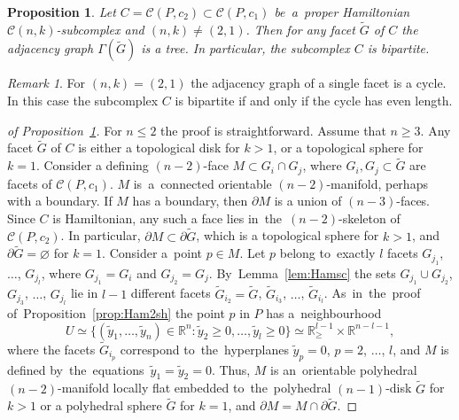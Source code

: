 \documentclass[12pt]{amsart}
\newtheorem{proposition}[formula]{Proposition}
\theoremstyle{definition}
\theoremstyle{remark}
\newtheorem{remark}[formula]{Remark}
\begin{document}
\begin{proposition}\label{prop:cnkbh}
Let $C=\mathcal{C}(P,c_2)\subset \mathcal{C}(P,c_1)$ be~a~proper Hamiltonian \linebreak $\mathcal{C}(n,k)$-subcomplex
and $(n,k)\ne (2,1)$. 
Then for any facet $\widetilde{G}$ of $C$ the adjacency graph $\Gamma(\widetilde{G})$ is a tree. In particular, the subcomplex $C$ is bipartite.
\end{proposition}
\begin{remark} For $(n,k)=(2,1)$ the adjacency graph of a single facet is a cycle. 
In this case the subcomplex $C$ is bipartite if and only if the cycle has even length.
\end{remark}
\begin{proof}[of Proposition~\ref{prop:cnkbh}]
For $n\leqslant 2$ the proof is straightforward. Assume that $n\geqslant 3$.
Any facet $\widetilde{G}$ of $C$ is either a topological disk for $k>1$, or a topological sphere for $k=1$. 
Consider a defining $(n-2)$-face $M\subset G_i\cap G_j$,
where $G_i,G_j\subset \widetilde{G}$ are facets of $\mathcal{C}(P,c_1)$. $M$ is~a~connected orientable $(n-2)$-manifold,
perhaps with a boundary. If $M$ has a boundary, then $\partial M$ is a union of $(n-3)$-faces. 
Since $C$ is Hamiltonian, any such a face lies in~the~$(n-2)$-skeleton of $\mathcal{C}(P,c_2)$. 
In particular, $\partial M\subset \partial \widetilde{G}$, which is a topological sphere for $k>1$, and 
$\partial \widetilde{G}=\varnothing$ for $k=1$. Consider a~point $p\in M$. Let $p$ belong
to~exactly $l$ facets $G_{j_1}$, $\dots$, $G_{j_l}$, where $G_{j_1}=G_i$ and $G_{j_2}=G_j$. 
By~Lemma~\ref{lem:Hamsc} the sets $G_{j_1}\cup G_{j_2}$,
$G_{j_3}$, $\dots$, $G_{j_l}$ lie in $l-1$ different facets $\widetilde{G}_{i_2}=\widetilde{G}$, $\widetilde{G}_{i_3}$, 
$\dots$, $\widetilde{G}_{i_l}$. As~in~the~proof of~Proposition~\ref{prop:Ham2sh} the point $p$ in $P$ has a~neighbourhood 
$$
U\simeq\{(\widetilde{y}_1,\dots,\widetilde{y}_n)
\in\mathbb R^n\colon \widetilde{y}_2\geqslant 0,\dots,\widetilde{y}_l\geqslant 0\}
\simeq \mathbb R^{l-1}_{\geqslant}\times\mathbb R^{n-l-1},
$$
where the facets $\widetilde{G}_{i_p}$ correspond to~the~hyperplanes
$\widetilde{y}_p=0$, $p=2$, $\dots$, $l$, and $M$ is defined by~the~equations~$\widetilde{y}_1=\widetilde{y}_2=0$.
Thus, $M$ is an~orientable polyhedral $(n-2)$-manifold locally flat embedded to~the~polyhedral $(n-1)$-disk $\widetilde{G}$ 
for $k>1$ or a polyhedral sphere $\widetilde{G}$ for $k=1$, and $\partial M=M\cap \partial \widetilde{G}$.


\end{proof}
\end{document}
